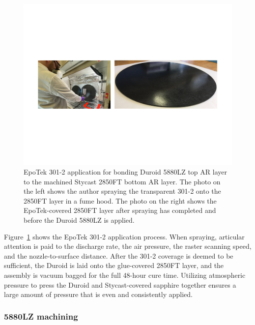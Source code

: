 \begin{figure}[!t]
    \centering
    \includegraphics[width=\linewidth, trim=2cm 7cm 2cm 7cm, clip]{ARCoating/Figures/epotek_application.pdf}
    \caption[EpoTek 301-2 application for bonding Duroid 5880LZ top AR layer to the machined Stycast 2850FT bottom AR layer.]{EpoTek 301-2 application for bonding Duroid 5880LZ top AR layer to the machined Stycast 2850FT bottom AR layer. The photo on the left shows the author spraying the transparent 301-2 onto the 2850FT layer in a fume hood. The photo on the right shows the EpoTek-covered 2850FT layer after spraying has completed and before the Duroid 5880LZ is applied.}
    \label{fig:epotek_application}
\end{figure}

Figure~\ref{fig:epotek_application} shows the EpoTek 301-2 application process. When spraying, articular attention is paid to the discharge rate, the air pressure, the raster scanning speed, and the nozzle-to-surface distance. After the 301-2 coverage is deemed to be sufficient, the Duroid is laid onto the glue-covered 2850FT layer, and the assembly is vacuum bagged for the full 48-hour cure time. Utilizing atmospheric pressure to press the Duroid and Stycast-covered sapphire together ensures a large amount of pressure that is even and consistently applied.


\subsubsection{5880LZ machining}
\label{sec:sapphire_ar_coating_epoxy_plastic_fabrication_5880LZ_machining}

